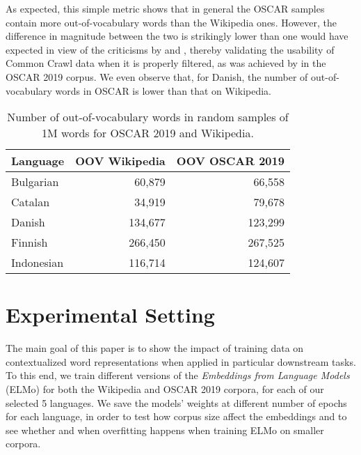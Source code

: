 As expected, this simple metric shows that in general the OSCAR samples contain more out-of-vocabulary words than the Wikipedia ones. However, the difference in magnitude between the two is strikingly lower than one would have expected in view of the criticisms by \citet{trinh-le-2018-a} and \citet{radford-etal-2019-language}, thereby validating the usability of Common Crawl data when it is properly filtered, as was achieved by in the OSCAR 2019 corpus. We even observe that, for Danish, the number of out-of-vocabulary words in OSCAR is lower than that on Wikipedia.

\begin{table}[t]
    \centering\small
    \begin{tabular}{lrr}\toprule
        Language   & \multicolumn{1}{l}{OOV Wikipedia} & \multicolumn{1}{l}{OOV OSCAR 2019} \\ \midrule
        Bulgarian  & 60,879                            & 66,558                        \\
        Catalan    & 34,919                            & 79,678                        \\
        Danish     & 134,677                           & 123,299                       \\
        Finnish    & 266,450                           & 267,525                       \\
        Indonesian & 116,714                           & 124,607                       \\
        \bottomrule
    \end{tabular}
    \caption{Number of out-of-vocabulary words in random samples of 1M words for OSCAR 2019 and Wikipedia.}
    \label{tab:OOV}
\end{table}

\section{Experimental Setting}

The main goal of this paper is to show the impact of training data on contextualized word representations when applied in particular downstream tasks. To this end, we train different versions of the \emph{Embeddings from Language Models} (ELMo) \citep{peters-etal-2018-deep} for both the Wikipedia and OSCAR 2019 corpora, for each of our selected 5 languages. We save the models' weights at different number of epochs for each language, in order to test how corpus size affect the embeddings and to see whether and when overfitting happens when training ELMo on smaller corpora.


